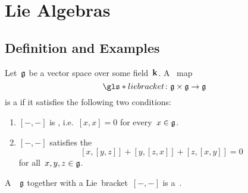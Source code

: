 \section{Lie Algebras}











\subsection{Definition and Examples}


\begin{definition}
  Let~$\mathfrak{g}$ be a vector space over some field~$\kf$.
  A~{\bilinear{$\kf$}} map
  \[
    \gls*{lie bracket}
    \colon
    \glie \times \glie
    \to
    \glie
  \]
  is a  if it satisfies the following two conditions:
  \begin{enumerate}
    \item
    $[-, -]$ is , i.e.~$[x,x] = 0$ for every~$x \in \mathfrak{g}$.
    \item
    $[-, -]$ satisfies the 
    \[
      [x,[y,z]] + [y,[z,x]] + [z,[x,y]]
      =
      0
    \]
    for all~$x,y,z \in \mathfrak{g}$.
  \end{enumerate}
  A~{\vectorspace{$\kf$}}~$\mathfrak{g}$ together with a Lie~bracket~$[-,-]$ is a~.
\end{definition}



